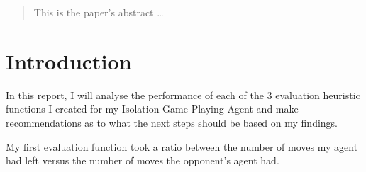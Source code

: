 \documentclass[12pt]{article}
\begin{document}
\maketitle

\begin{abstract}
This is the paper's abstract \ldots
\end{abstract}

\section{Introduction}
In this report, I will analyse the performance of each of the 3 evaluation heuristic functions I created for my Isolation Game Playing Agent and make recommendations as to what the next steps should be based on my findings.

My first evaluation function took a ratio between the number of moves my agent had left versus the number of moves the opponent's agent had. 
\end{document}
